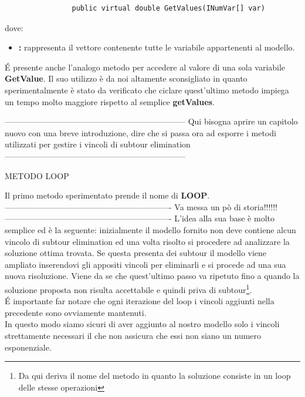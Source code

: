 \documentclass[11pt]{article}
\begin{document}
\begin{lstlisting}
                public virtual double GetValues(INumVar[] var)
\end{lstlisting}

dove:

\begin{itemize}
\item \textbf: rappresenta il vettore contenente tutte le variabile appartenenti al modello.
\end{itemize}

\'E presente anche l'analogo metodo per accedere al valore di una sola variabile \textbf{GetValue}. Il suo utilizzo è da noi altamente sconsigliato in quanto sperimentalmente è stato da verificato che ciclare quest'ultimo metodo impiega un tempo molto maggiore rispetto al semplice \textbf{getValues}.



------------------------------------------------------------------
Qui bisogna aprire un capitolo nuovo con una breve introduzione, dire che si passa ora ad esporre i metodi utilizzati per gestire i vincoli di subtour elimination
------------------------------------------------------------------


\vspace{2\baselineskip}
METODO LOOP
\vspace{2\baselineskip}

Il primo metodo sperimentato prende il nome di \textbf{LOOP}.
-------------------------------------------------------------
Va messa un pò di storia!!!!!!
-------------------------------------------------------------
L'idea alla sua base è molto semplice ed è la seguente: inizialmente il modello fornito non deve contiene alcun vincolo di subtour elimination ed una volta risolto si procedere ad analizzare la soluzione ottima trovata. Se questa presenta dei subtour il modello viene ampliato inserendovi gli appositi vincoli per eliminarli e si procede ad una sua nuova risoluzione. Viene da se che quest'ultimo passo va ripetuto fino a quando la soluzione proposta non risulta accettabile e quindi priva di subtour\footnote{Da qui deriva il nome del metodo in quanto la soluzione consiste in un loop delle stesse operazioni}.\\\'E importante far notare che ogni iterazione del loop i vincoli aggiunti nella precedente sono ovviamente mantenuti.\\
In questo modo siamo sicuri di aver aggiunto al nostro modello solo i vincoli strettamente necessari il che non assicura che essi non siano un numero esponenziale.\\
\end{document}
